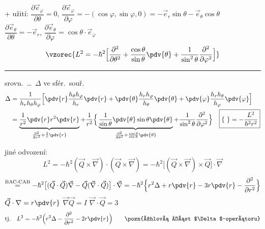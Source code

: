{\color{gray}
+ užití: \quad $\dfrac{\partial\vec e_\varphi}{\partial\theta} = 0$, \quad
$\dfrac{\partial\vec e_\varphi}{\partial\varphi} = -(\cos\varphi,\sin\varphi,0) = -\vec e_r\sin\theta - \vec e_\theta\cos\theta$ \\
\hspace*{1.4cm} $\dfrac{\partial\vec e_\theta}{\partial\theta} = -\vec e_r$, \quad $\dfrac{\partial\vec e_\theta}{\partial\varphi} = \cos\theta\cdot\vec e_\varphi$
\[
  \vzorec{L^2 = -\hbar^2\Big[\frac{\partial^2}{\partial\theta^2} + \frac{\cos\theta}{\sin\theta}\pdv{\theta} + \frac{1}{\sin^2\theta}\frac{\partial^2}{\partial\varphi^2}\Big]}
\]
\rule{0.6\linewidth}{0.3pt}

srovn.\ \dots\ $\Delta$ ve sfér.\ souř.
\begin{align*}
  \Delta &= \frac{1}{h_rh_\theta h_\varphi}\Big[\pdv{r}\frac{h_\theta h_\varphi}{h_r}\pdv{r} + \pdv{\theta}\frac{h_rh_\varphi}{h_\theta}\pdv{\theta} + \pdv{\varphi}\frac{h_rh_\theta}{h_\varphi}\pdv{\varphi}\Big] \\
  &= \underbrace{\frac{1}{r^2}\pdv{r}r^2\pdv{r}}_{\frac{\partial^2}{\partial r^2} + \frac2r\pdv{r}}
   + \frac{1}{r^2}\Big\{\underbrace{\frac{1}{\sin\theta}\pdv{\theta}\sin\theta\pdv{\theta}}_{\frac{\partial^2}{\partial\theta^2} + \frac{\cos\theta}{\sin\theta}\pdv{\theta}} + \frac{1}{\sin^2\theta}\frac{\partial^2}{\partial\varphi^2}\Big\}
   \quad \boxed{\{\ \} = -\frac{L^2}{\hbar^2r^2}}
\end{align*}
}

jiné odvození:
\[
  L^2 = -\hbar^2(\vec Q\times\vec\nabla)\cdot(\vec Q\times\vec\nabla) = -\hbar^2\big[(\vec Q\times\vec\nabla)\times\vec Q\big]\cdot\vec\nabla
\]
\[
  \overset{\text{BAC-CAB}}{=} -\hbar^2\big[(\vec Q\cdot\vec Q)\vec\nabla - \vec Q(\vec\nabla\cdot\vec Q)\big]\cdot\vec\nabla
  = -\hbar^2\Big\{r^2\Delta + r\pdv{r} - 3r\pdv{r} - \frac{\partial^2}{\partial r^2}\Big\}
\]
\hspace*{5.5cm} $\vec Q\cdot\nabla = r\pdv{r}$ \quad $\vec\nabla\vec Q = I$ \quad $\vec\nabla\cdot\vec Q = 3$
\[
  \text{tj.}\quad L^2 = -\hbar^2\Big(r^2\Delta - \frac{\partial^2}{\partial r^2} - 2r\pdv{r}\Big)
  \qquad \pozn{úhlová část $\Delta$-operátoru}
\]

